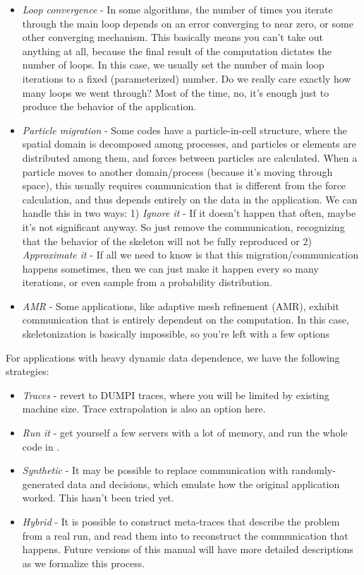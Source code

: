 \begin{itemize}
\item \textit{Loop convergence} - In some algorithms, the number of times you iterate through the main loop depends on an error converging to near zero, or some other converging mechanism.  This basically means you can't take out anything at all, because the final result of the computation dictates the number of loops.  In this case, we usually set the number of main loop iterations to a fixed (parameterized) number.  Do we really care exactly how many loops we went through?  Most of the time, no, it's enough just to produce the behavior of the application.  
\item \textit{Particle migration} - Some codes have a particle-in-cell structure, where the spatial domain is decomposed among processes, and particles or elements are distributed among them, and forces between particles are calculated.  When a particle moves to another domain/process (because it's moving through space), this usually requires communication that is different from the force calculation, and thus depends entirely on the data in the application.  We can handle this in two ways: 1) \textit{Ignore it} - If it doesn't happen that often, maybe it's not significant anyway.  So just remove the communication, recognizing that the behavior of the skeleton will not be fully reproduced or 2) \textit{Approximate it} - If all we need to know is that this migration/communication happens sometimes, then we can just make it happen every so many iterations, or even sample from a probability distribution.  
\item \textit{AMR} - Some applications, like adaptive mesh refinement (AMR), exhibit communication that is entirely dependent on the computation.  In this case, skeletonization is basically impossible, so you're left with a few options
\end{itemize}

For applications with heavy dynamic data dependence, we have the following strategies:
\begin{itemize}
\item \textit{Traces}  - revert to DUMPI traces, where you will be limited by existing machine size.  Trace extrapolation is also an option here.
\item \textit{Run it} - get yourself a few servers with a lot of memory, and run the whole code in \sstmacro.
\item \textit{Synthetic} - It may be possible to replace communication with randomly-generated data and decisions, which emulate how the original application worked. This hasn't been tried yet.
\item \textit{Hybrid} - It is possible to construct meta-traces that describe the problem from a real run, and read them into \sstmacro to reconstruct the communication that happens.  Future versions of this manual will have more detailed descriptions as we formalize this process.
\end{itemize}

